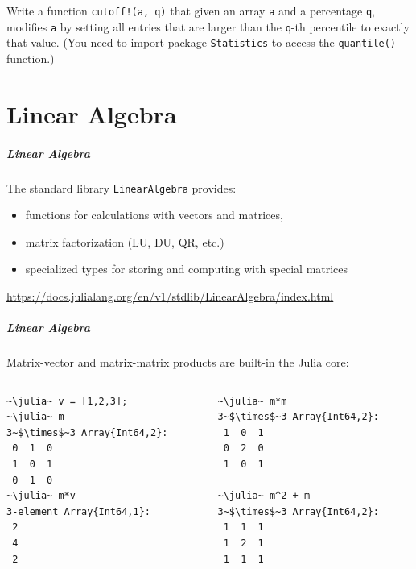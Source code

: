\documentclass[english,serif,mathserif,xcolor=pdftex,dvipsnames,table]{beamer}
\begin{document}
\begin{frame}
  \begin{exercise*}[4.F]
    Write a function \texttt{cutoff!(a, q)} that given an array
    \texttt{a} and a percentage \texttt{q}, modifies \texttt{a} by
    setting all entries that are larger than the \texttt{q}-th
    percentile to exactly that value.  (You need to import package
    \texttt{Statistics} to access the \texttt{quantile()} function.)
  \end{exercise*}

\end{frame}


\part{Linear Algebra}
\begin{frame}
  \frametitle{Linear Algebra}
  The standard library \texttt{LinearAlgebra} provides:
  \begin{itemize}
  \item functions for calculations with vectors and matrices,
  \item matrix factorization (LU, DU, QR, etc.)
  \item specialized types for storing and computing with special matrices
  \end{itemize}

  \+
  \begin{references}
    \url{https://docs.julialang.org/en/v1/stdlib/LinearAlgebra/index.html}
  \end{references}
\end{frame}


\begin{frame}[fragile]
  \frametitle{Linear Algebra}
  Matrix-vector and matrix-matrix products are built-in the Julia core:
  \begin{columns}
    \begin{column}{0.5\textwidth}
\begin{lstlisting}
~\julia~ v = [1,2,3];
~\julia~ m
3~$\times$~3 Array{Int64,2}:
 0  1  0
 1  0  1
 0  1  0
~\julia~ m*v
3-element Array{Int64,1}:
 2
 4
 2
\end{lstlisting}
    \end{column}
    \begin{column}{0.5\textwidth}
\begin{lstlisting}
~\julia~ m*m
3~$\times$~3 Array{Int64,2}:
 1  0  1
 0  2  0
 1  0  1

~\julia~ m^2 + m
3~$\times$~3 Array{Int64,2}:
 1  1  1
 1  2  1
 1  1  1
\end{lstlisting}
    \end{column}
  \end{columns}
\end{frame}
\end{document}
